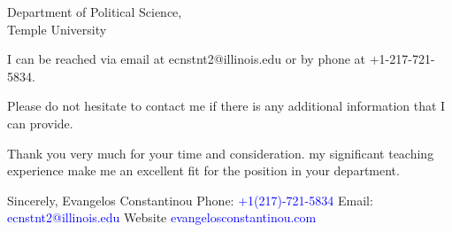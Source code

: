 \documentclass[12pt]{letter}
\begin{document}
\begin{letter}{Department of Political Science,\\
Temple University}

I can be reached via email at ecnstnt2@illinois.edu or by phone at +1-217-721-5834.

Please do not hesitate to contact me if there is any additional information that I can provide.

Thank you very much for your time and consideration.
my significant teaching experience make me an excellent fit for the position in your department. 


\noindent Sincerely,
\newline\noindent Evangelos Constantinou
\vspace{4mm}
\newline\noindent Phone: \textcolor{blue}{+1(217)-721-5834}
\newline\noindent Email: \textcolor{blue}{ecnstnt2@illinois.edu}
\newline\noindent Website \textcolor{blue}{evangelosconstantinou.com}
\end{letter}
\end{document}
